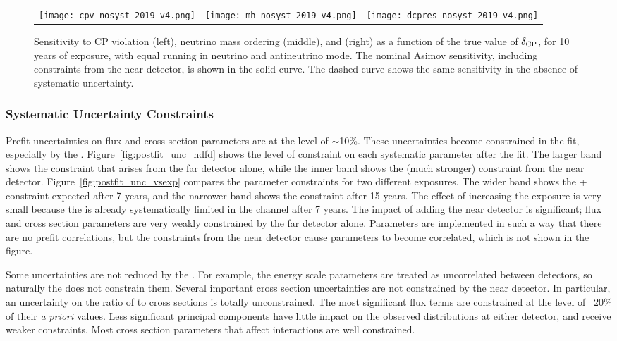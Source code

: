 \begin{figure}[h!]
    \centering
    \begin{tabular}{ccc}
		\texttt{[image: cpv\_nosyst\_2019\_v4.png]} &
		\texttt{[image: mh\_nosyst\_2019\_v4.png]} &
		\texttt{[image: dcpres\_nosyst\_2019\_v4.png]}
	\end{tabular}
	\caption[Sensitivity to CP violation, neutrino mass ordering, and \deltacp, as a function of  $\deltacp$]{Sensitivity to CP violation (left), neutrino mass ordering (middle), and \deltacp (right) as a function of the true value of $\deltacp$, for 10 years of exposure, with equal running in neutrino and antineutrino mode. The nominal Asimov sensitivity, including constraints from the near detector, is shown in the solid curve. The dashed curve shows the same sensitivity in the absence of systematic uncertainty.}
    \label{fig:results_systs}
\end{figure}

\subsubsection{Systematic Uncertainty Constraints}

Prefit uncertainties on flux and cross section parameters are at the level of $\sim$10\%. These uncertainties become constrained in the fit, especially by the . Figure~\ref{fig:postfit_unc_ndfd} shows the level of constraint on each systematic parameter after the fit. The larger band shows the constraint that arises from the far detector alone, while the inner band shows the (much stronger) constraint from the near detector. Figure~\ref{fig:postfit_unc_vsexp} compares the parameter constraints for two different exposures. The wider band shows the + constraint expected after 7 years, and the narrower band shows the constraint after 15 years. The effect of increasing the exposure is very small because the  is already systematically limited in the \numu {} channel after 7 years. The impact of adding the near detector is significant; flux and cross section parameters are very weakly constrained by the far detector alone. Parameters are implemented in such a way that there are no prefit correlations, but the constraints from the near detector cause parameters to become correlated, which is not shown in the figure.

Some uncertainties are not reduced by the . For example, the energy scale parameters are treated as uncorrelated between detectors, so naturally the  does not constrain them. Several important cross section uncertainties are not constrained by the near detector. In particular, an uncertainty on the ratio of \numu to \nue cross sections is totally unconstrained. The most significant flux terms are constrained at the level of ~20\% of their \textit{a priori} values.  Less significant principal components have little impact on the observed distributions at either detector, and receive weaker constraints. Most cross section parameters that affect  interactions are well constrained.

